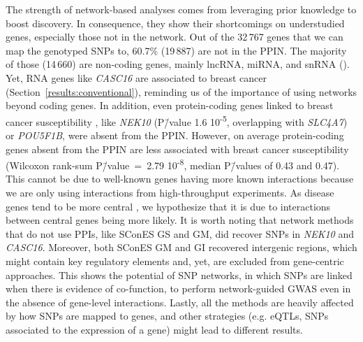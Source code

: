 \documentclass[10pt,letterpaper]{article}
\begin{document}
The strength of network-based analyses comes from leveraging prior knowledge to boost discovery. In consequence, they show their shortcomings on understudied genes, especially those not in the network. Out of the 32\,767 genes that we can map the genotyped SNPs to, 60.7\% (19\,887) are not in the PPIN. The majority of those (14\,660) are non-coding genes, mainly lncRNA, miRNA, and snRNA (). Yet, RNA genes like \emph{CASC16} are associated to breast cancer (Section~\ref{results:conventional}), reminding us of the importance of using networks beyond coding genes. In addition, even protein-coding genes linked to breast cancer susceptibility \cite{ahmed_newly_2009}, like \emph{NEK10} (P\=/value 1.6 \texttimes{} 10\textsuperscript{-5}, overlapping with \emph{SLC4A7}) or \emph{POU5F1B}, were absent from the PPIN. However, on average protein-coding genes absent from the PPIN are less associated with breast cancer susceptibility (Wilcoxon rank-sum P\=/value~=~2.79 \texttimes{} 10\textsuperscript{-8}, median P\=/values of 0.43 and 0.47). This cannot be due to well-known genes having more known interactions because we are only using interactions from high-throughput experiments. As disease genes tend to be more central \cite{pinero_uncovering_2016}, we hypothesize that it is due to interactions between central genes being more likely. It is worth noting that  network methods that do not use PPIs, like SConES GS and GM, did recover SNPs in \emph{NEK10} and \emph{CASC16}. Moreover, both SConES GM and GI recovered intergenic regions, which might contain key regulatory elements \cite{gallagherPostGWASEraAssociation2018} and, yet, are excluded from gene-centric approaches. This shows the potential of SNP networks, in which SNPs are linked when there is evidence of co-function, to perform network-guided GWAS even in the absence of gene-level interactions. Lastly, all the methods are heavily affected by how SNPs are mapped to genes, and other strategies (e.g. eQTLs, SNPs associated to the expression of a gene) might lead to different results. 
\end{document}
